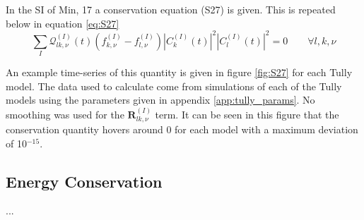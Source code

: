 In the SI of Min, 17 \cite{min_ab_2017} a conservation equation (S27) is given. This is repeated below in equation \eqref{eq:S27}
\begin{equation}
	\sum_{I} \mathcal{Q}_{lk, \nu}^{(I)}(t) \left( f_{k, \nu}^{(I)} - f_{l, \nu}^{(I)} \right) |C_{k}^{(I)} (t)|^2 |C_{l}^{(I)} (t)|^2 = 0  \qquad \forall l, k, \nu
	\label{eq:S27}
\end{equation}

An example time-series of this quantity is given in figure \ref{fig:S27} for each Tully model. The data used to calculate come from simulations of each of the Tully models using the parameters given in appendix \ref{app:tully_params}. No smoothing was used for the $\mathbf{R}_{lk, \nu}^{(I)}$ term. It can be seen in this figure that the conservation quantity hovers around 0 for each model with a maximum deviation of 10$^{-15}$.


\subsection{Energy Conservation}
...
